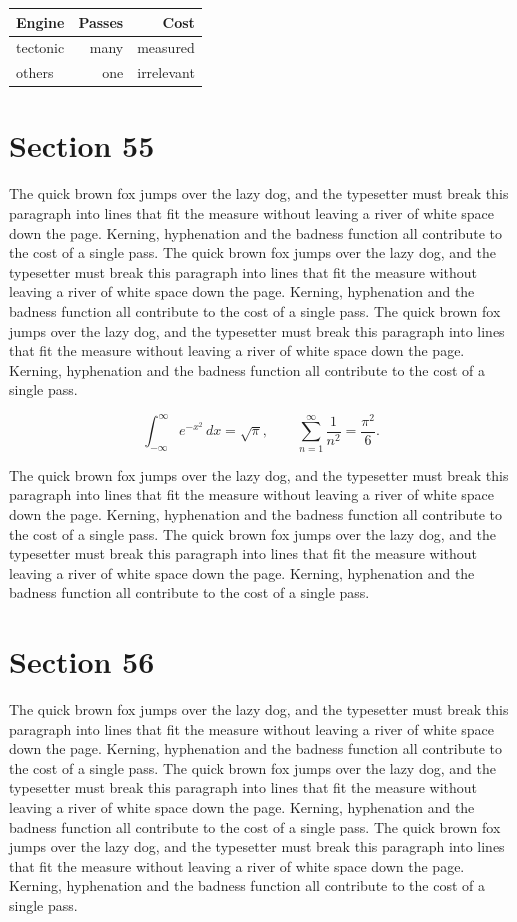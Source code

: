 \documentclass{article}
\begin{document}
\begin{center}
\begin{tabular}{lrr}
\toprule
Engine & Passes & Cost \\
\midrule
tectonic & many & measured \\
others & one & irrelevant \\
\bottomrule
\end{tabular}
\end{center}

\section{Section 55}
The quick brown fox jumps over the lazy dog, and the typesetter must break this paragraph into lines that fit the measure without leaving a river of white space down the page. Kerning, hyphenation and the badness function all contribute to the cost of a single pass. The quick brown fox jumps over the lazy dog, and the typesetter must break this paragraph into lines that fit the measure without leaving a river of white space down the page. Kerning, hyphenation and the badness function all contribute to the cost of a single pass. The quick brown fox jumps over the lazy dog, and the typesetter must break this paragraph into lines that fit the measure without leaving a river of white space down the page. Kerning, hyphenation and the badness function all contribute to the cost of a single pass. 

\begin{equation}
\int_{-\infty}^{\infty} e^{-x^{2}}\,dx = \sqrt{\pi}, \qquad
\sum_{n=1}^{\infty} \frac{1}{n^{2}} = \frac{\pi^{2}}{6}.
\end{equation}

The quick brown fox jumps over the lazy dog, and the typesetter must break this paragraph into lines that fit the measure without leaving a river of white space down the page. Kerning, hyphenation and the badness function all contribute to the cost of a single pass. The quick brown fox jumps over the lazy dog, and the typesetter must break this paragraph into lines that fit the measure without leaving a river of white space down the page. Kerning, hyphenation and the badness function all contribute to the cost of a single pass. 
\section{Section 56}
The quick brown fox jumps over the lazy dog, and the typesetter must break this paragraph into lines that fit the measure without leaving a river of white space down the page. Kerning, hyphenation and the badness function all contribute to the cost of a single pass. The quick brown fox jumps over the lazy dog, and the typesetter must break this paragraph into lines that fit the measure without leaving a river of white space down the page. Kerning, hyphenation and the badness function all contribute to the cost of a single pass. The quick brown fox jumps over the lazy dog, and the typesetter must break this paragraph into lines that fit the measure without leaving a river of white space down the page. Kerning, hyphenation and the badness function all contribute to the cost of a single pass. 
\end{document}
